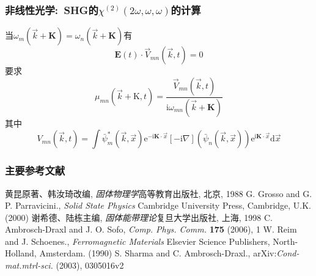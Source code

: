 \documentclass[cjk,slidestop,compress,mathserif,blue]{beamer}
\begin{document}
\frame
{
	\frametitle{非线性光学:~\textrm{SHG}的$\chi^{(2)}(2\omega,\omega,\omega)$的计算}
	当$\omega_m(\vec k+\mathbf{K})=\omega_n(\vec k+\mathbf{K})$有
	\begin{displaymath}
		\mathbf{E}(t)\cdot\vec V_{mn}(\vec k,t)=0
	\end{displaymath}
	要求
	\begin{displaymath}
		\mu_{mn}(\vec k+\mathrm{K},t)=\frac{\vec V_{mn}(\vec k,t)}{\mathrm{i}\omega_{mn}(\vec k+\mathbf{K})}
	\end{displaymath}
	其中
	\begin{displaymath}
		V_{mn}(\vec k,t)=\int\bar\psi_m^{\ast}(\vec k,\vec x)\mathrm{e}^{-\mathrm{i}\mathbf{K}\cdot\vec x}[-\mathrm{i}\nabla](\bar\psi_n(\vec k,\vec x))\mathrm{e}^{\mathrm{i}\mathbf{K}\cdot\vec x}\mathrm{d}\vec x
	\end{displaymath}
}
	
\begin{thebibliography}{99}
\frame
{
\frametitle{主要参考文献}
{\small
	黄昆\:原著、韩汝琦\:改编, {\textit{固体物理学}}\:高等教育出版社, 北京, 1988
	\textrm{G. Grosso and G. P. Parravicini., \textit{Solid State Physics}\; Cambridge University Press, Cambridge, U.K. (2000)}
	谢希德、陆栋\:主编, {\textit{固体能带理论}}\:复旦大学出版社, 上海, 1998
	\textrm{C. Ambrosch-Draxl and J. O. Sofo, \textit{Comp. Phys. Comm.} \textbf{175} (2006), 1}
	\textrm{W. Reim and J. Schoenes., \textit{Ferromagnetic Materials}\; Elsevier Science Publishers, North-Holland, Amsterdam. (1990)}
	\textrm{S. Sharma and C. Ambrosch-Draxl., arXiv:\textit{Cond-mat.mtrl-sci.} (2003), 0305016v2}
	\fontsize{8.8pt}{3.9pt}
}
\nocite*{}
}
\end{thebibliography}



\end{document}
